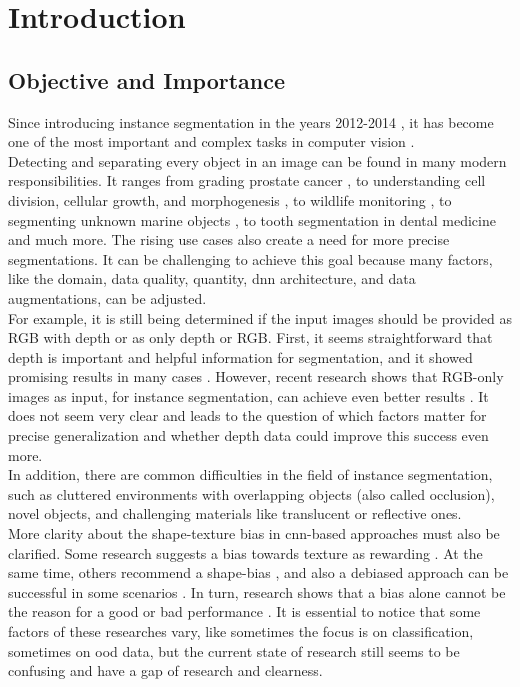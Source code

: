 
\chapter{Introduction}
\label{chap:kapitel1}



	\section{Objective and Importance}
	\label{sec:objective-and-importance}	
		Since introducing instance segmentation in the years 2012-2014 \cite{Yang2012}\cite{Silbermann2012}\cite{Hariharan2014}, it has become one of the most important and complex tasks in computer vision \cite{Sharma2022}. \\
		Detecting and separating every object in an image can be found in many modern responsibilities. It ranges from grading prostate cancer \cite{Hassan2022}, to understanding cell division, cellular growth, and morphogenesis \cite{Kar2022}, to wildlife monitoring \cite{Haucke2021}, to segmenting unknown marine objects \cite{Hu2024}, to tooth segmentation in dental medicine \cite{Brahmi2023} and much more. The rising use cases also create a need for more precise segmentations. It can be challenging to achieve this goal because many factors, like the domain, data quality, quantity, \ac{dnn} architecture, and data augmentations, can be adjusted.\\
		For example, it is still being determined if the input images should be provided as RGB with depth or as only depth or RGB. First, it seems straightforward that depth is important and helpful information for segmentation, and it showed promising results in many cases \cite{Danielczuk2019}\cite{Xie2021}. However, recent research shows that RGB-only images as input, for instance segmentation, can achieve even better results \cite{Raj2023}. It does not seem very clear and leads to the question of which factors matter for precise generalization and whether depth data could improve this success even more.\\
		In addition, there are common difficulties in the field of instance segmentation, such as cluttered environments with overlapping objects (also called occlusion), novel objects, and challenging materials like translucent or reflective ones.\\
		More clarity about the shape-texture bias in \ac{cnn}-based approaches must also be clarified. Some research suggests a bias towards texture as rewarding \cite{Qiu2024}. At the same time, others recommend a shape-bias \cite{Geihors2019}, and also a debiased approach can be successful in some scenarios \cite{Li2021}\cite{Co2021}\cite{Chung2023}. In turn, research shows that a bias alone cannot be the reason for a good or bad performance \cite{Gavrikov2024}. It is essential to notice that some factors of these researches vary, like sometimes the focus is on classification, sometimes on \ac{ood} data, but the current state of research still seems to be confusing and have a gap of research and clearness.\\
